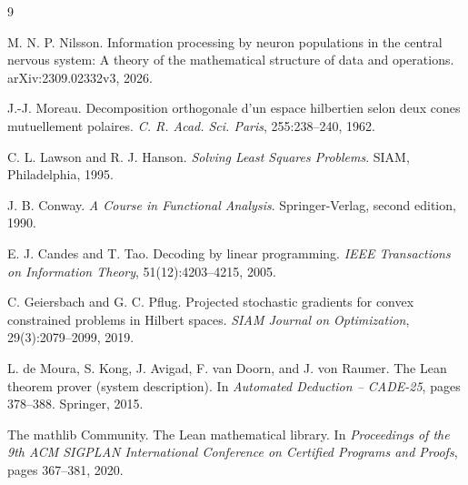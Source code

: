 \documentclass[11pt,a4paper]{article}
\begin{document}
\clearpage
\begin{thebibliography}{9}

M. N. P. Nilsson.
\newblock Information processing by neuron populations in the central nervous
system: A theory of the mathematical structure of data and operations.
\newblock arXiv:2309.02332v3, 2026.

J.-J. Moreau.
\newblock Decomposition orthogonale d'un espace hilbertien selon deux cones
mutuellement polaires.
\newblock \emph{C. R. Acad. Sci. Paris}, 255:238--240, 1962.

C. L. Lawson and R. J. Hanson.
\newblock \emph{Solving Least Squares Problems}.
\newblock SIAM, Philadelphia, 1995.

J. B. Conway.
\newblock \emph{A Course in Functional Analysis}.
\newblock Springer-Verlag, second edition, 1990.

E. J. Candes and T. Tao.
\newblock Decoding by linear programming.
\newblock \emph{IEEE Transactions on Information Theory},
51(12):4203--4215, 2005.

C. Geiersbach and G. C. Pflug.
\newblock Projected stochastic gradients for convex constrained problems in
Hilbert spaces.
\newblock \emph{SIAM Journal on Optimization}, 29(3):2079--2099, 2019.

L. de Moura, S. Kong, J. Avigad, F. van Doorn, and J. von Raumer.
\newblock The Lean theorem prover (system description).
\newblock In \emph{Automated Deduction -- CADE-25}, pages 378--388.
Springer, 2015.

The mathlib Community.
\newblock The Lean mathematical library.
\newblock In \emph{Proceedings of the 9th ACM SIGPLAN International
Conference on Certified Programs and Proofs}, pages 367--381, 2020.

\end{thebibliography}
\end{document}
